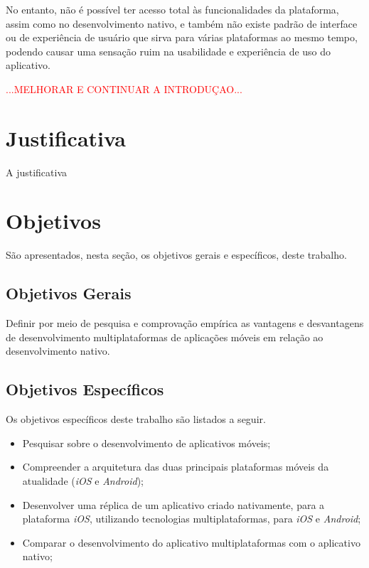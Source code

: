 No entanto, não é possível ter acesso total às funcionalidades da plataforma, assim como no desenvolvimento nativo, e também não existe padrão de interface ou de experiência de usuário que sirva
para várias plataformas ao mesmo tempo, podendo causar uma sensação ruim na usabilidade e experiência de uso do aplicativo.

\textcolor{red}{...MELHORAR E CONTINUAR A INTRODUÇAO...}

\section{Justificativa}

A justificativa

\section{Objetivos} \label{sec:objetivos}

São apresentados, nesta seção, os objetivos gerais e específicos, deste trabalho. 

\subsection{Objetivos Gerais}  \label{sec:objetivos_gerais}

Definir por meio de pesquisa e comprovação empírica as vantagens e desvantagens de desenvolvimento multiplataformas de aplicações móveis em relação ao desenvolvimento nativo. 

\subsection{Objetivos Específicos}  \label{sec:objetivos_especificos}

Os objetivos específicos deste trabalho são listados a seguir.

\begin{itemize}
    \item Pesquisar sobre o desenvolvimento de aplicativos móveis;
    \item Compreender a arquitetura das duas principais plataformas móveis da atualidade (\textit{iOS} e \textit{Android});
    \item Desenvolver uma réplica de um aplicativo criado nativamente, para a plataforma \textit{iOS}, utilizando tecnologias multiplataformas, para \textit{iOS} e \textit{Android};
    \item Comparar o desenvolvimento do aplicativo multiplataformas com o aplicativo nativo;
\end{itemize}

